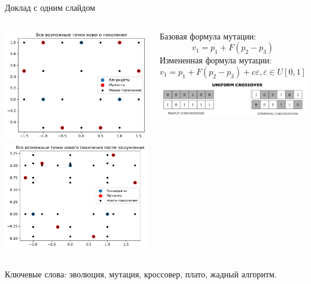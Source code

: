 \documentclass{beamer}
\begin{document}
\begin{frame}{Доклад с одним слайдом}

\begin{columns}[c]
\includegraphics[width=1\textwidth]{V.pdf}
\includegraphics[width=1\textwidth]{V_noisy.pdf}

Базовая формула мутации:
    $$v_1 = p_1 + F(p_2 - p_3)$$
Измененная формула мутации:
    $$v_1 = p_1 + F(p_2 - p_3) + c\varepsilon, \varepsilon \in U[0, 1]$$
\includegraphics[width=1\textwidth]{crossover.jpg}
\end{columns}

\bigskip
Ключевые слова: {\color{red}эволюция, мутация, кроссовер, плато, жадный алгоритм}.
\end{frame}

\end{document}
